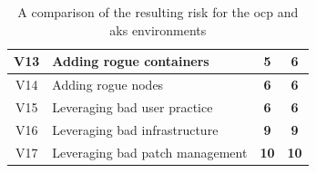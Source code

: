 \begin{table}[H]
{\begin{tabular}{|c|l|c|c|}
V13             & Adding rogue containers                                                                & \textbf{5}     & \textbf{6}     \\ \hline
V14             & Adding rogue nodes                                                                     & \textbf{6}     & \textbf{6}     \\ \hline
V15             & Leveraging bad user practice                                                           & \textbf{6}     & \textbf{6}     \\ \hline
V16             & Leveraging bad infrastructure                                                          & \textbf{9}     & \textbf{9}     \\ \hline
V17             & Leveraging bad patch management                                                        & \textbf{10}    & \textbf{10}    \\ \hline
\end{tabular}%
}
\caption{A comparison of the resulting risk for the \gls{ocp} and \gls{aks} environments\label{estimateComparison}}
\end{table}


